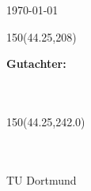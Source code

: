 \begin{titlepage}
\begin{textblock}{89}
\begin{minipage}{80mm}
\begin{center}
\begin{onehalfspace}
{	\today}
 \end{onehalfspace}
	\end{center}
	\vfill
\end{minipage}\end{textblock}

\begin{textblock}{150}(44.25,208)%
\begin{minipage}{120mm}
	\large
	\raggedright
	\sffamily
    {\fontsize{14pt}{14pt}
	\textbf{Gutachter:}\\
	\FirstSupervisor\\
	\SecondSupervisor\\}
\end{minipage}
\end{textblock}



\begin{textblock}{150}(44.25,242.0)%
\begin{minipage}{120mm}
	\fontsize{11.75pt}{11.75pt}\selectfont
	\raggedright
	\sffamily
	\textcolor{TUGreen}{\FirstChair}\\
	\textcolor{TUGreen}{\FirstChairTitle}\\
    \textcolor{TUGreen}{TU Dortmund}
\end{minipage}
\end{textblock}



\vspace*{20cm}



\end{titlepage}
